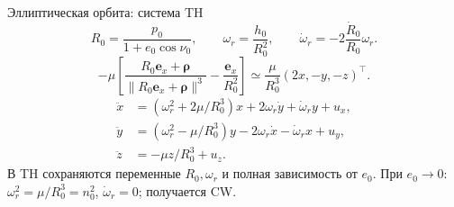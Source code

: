 \documentclass[11pt,aspectratio=169,t]{beamer}
\newcommand{\eqcompact}{\fontsize{10}{12}\selectfont}
\newcommand{\derivationmathspacing}{%
  \setlength{\abovedisplayskip}{2pt}%
  \setlength{\belowdisplayskip}{3pt}%
  \setlength{\abovedisplayshortskip}{2pt}%
  \setlength{\belowdisplayshortskip}{2pt}%
  \setlength{\jot}{2pt}}
\newcommand{\vect}[1]{\boldsymbol{#1}}
\begin{document}
\begin{frame}{Эллиптическая орбита: система TH}
\relax
\derivationmathspacing
{\eqcompact\derivationmathspacing
\[
 R_0=\frac{p_0}{1+e_0\cos\nu_0},\qquad
 \omega_r=\frac{h_0}{R_0^2},\qquad
 \dot\omega_r=-2\frac{\dot R_0}{R_0}\omega_r.
\]
\[
 -\mu\left[
 \frac{R_0\vect e_x+\vect\rho}{\lVert R_0\vect e_x+\vect\rho\rVert^3}
 -\frac{\vect e_x}{R_0^2}\right]
 \simeq\frac{\mu}{R_0^3}(2x,-y,-z)^\top.
\]
\[
 \boxed{\begin{aligned}
 \ddot x&=\left(\omega_r^2+2\mu/R_0^3\right)x
              +2\omega_r\dot y+\dot\omega_r y+u_x,\\[4pt]
 \ddot y&=\left(\omega_r^2-\mu/R_0^3\right)y
              -2\omega_r\dot x-\dot\omega_r x+u_y,\\[4pt]
 \ddot z&=-\mu z/R_0^3+u_z.
 \end{aligned}}
\]
}
\justifying
В TH сохраняются переменные $R_0,\omega_r$ и полная зависимость от $e_0$.
При $e_0\to0$: $\omega_r^2=\mu/R_0^3=n_0^2$, $\dot\omega_r=0$; получается CW.
\end{frame}
\end{document}
